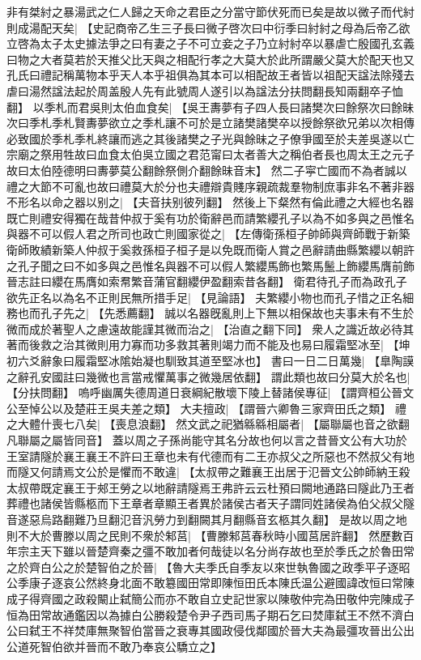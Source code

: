 非有桀紂之暴湯武之仁人歸之天命之君臣之分當守節伏死而已矣是故以微子而代紂則成湯配天矣|{
	【史記商帝乙生三子長曰微子啓次曰中衍季曰紂紂之母為后帝乙欲立啓為太子太史據法爭之曰有妻之子不可立妾之子乃立紂紂卒以暴虐亡殷國孔玄義曰物之大者莫若於天推父比天與之相配行孝之大莫大於此所謂嚴父莫大於配天也又孔氏曰禮記稱萬物本乎天人本乎祖俱為其本可以相配故王者皆以祖配天諡法除殘去虐曰湯然諡法起於周盖殷人先有此號周人遂引以為諡法分扶問翻長知兩翻卒子恤翻】}
以季札而君吳則太伯血食矣|{
	【吳王夀夢有子四人長曰諸樊次曰餘祭次曰餘昧次曰季札季札賢夀夢欲立之季札讓不可於是立諸樊諸樊卒以授餘祭欲兄弟以次相傳必致國於季札季札終讓而逃之其後諸樊之子光與餘昧之子僚爭國至於夫差吳遂以亡宗廟之祭用牲故曰血食太伯吳立國之君范甯曰太者善大之稱伯者長也周太王之元子故曰太伯陸德明曰夀夢莫公翻餘祭側介翻餘昧音末】}
然二子寜亡國而不為者誠以禮之大節不可亂也故曰禮莫大於分也夫禮辯貴賤序親疏裁羣物制庶事非名不著非器不形名以命之器以别之|{
	【夫音扶别彼列翻】}
然後上下粲然有倫此禮之大經也名器既亡則禮安得獨在哉昔仲叔于奚有功於衛辭邑而請繁纓孔子以為不如多與之邑惟名與器不可以假人君之所司也政亡則國家從之|{
	【左傳衛孫桓子帥師與齊師戰于新築衛師敗績新築人仲叔于奚救孫桓子桓子是以免既而衛人賞之邑辭請曲縣繁纓以朝許之孔子聞之曰不如多與之邑惟名與器不可以假人繁纓馬飾也繁馬鬛上飾纓馬膺前飾晉志註曰纓在馬膺如索帬繁音蒲官翻纓伊盈翻索昔各翻】}
衛君待孔子而為政孔子欲先正名以為名不正則民無所措手足|{
	【見論語】}
夫繁纓小物也而孔子惜之正名細務也而孔子先之|{
	【先悉薦翻】}
誠以名器旣亂則上下無以相保故也夫事未有不生於微而成於著聖人之慮遠故能謹其微而治之|{
	【治直之翻下同】}
衆人之識近故必待其著而後救之治其微則用力寡而功多救其著則竭力而不能及也易曰履霜堅冰至|{
	【坤初六爻辭象曰履霜堅冰隂始凝也馴致其道至堅冰也】}
書曰一日二日萬幾|{
	【臯陶謨之辭孔安國註曰幾微也言當戒懼萬事之微幾居依翻】}
謂此類也故曰分莫大於名也|{
	【分扶問翻】}
嗚呼幽厲失德周道日衰綱紀散壞下陵上替諸侯專征|{
	【謂齊桓公晉文公至悼公以及楚莊王吳夫差之類】}
大夫擅政|{
	【謂晉六卿魯三家齊田氏之類】}
禮之大體什喪七八矣|{
	【喪息浪翻】}
然文武之祀猶緜緜相屬者|{
	【屬聯屬也音之欲翻凡聯屬之屬皆同音】}
蓋以周之子孫尚能守其名分故也何以言之昔晉文公有大功於王室請隧於襄王襄王不許曰王章也未有代德而有二王亦叔父之所惡也不然叔父有地而隧又何請焉文公於是懼而不敢違|{
	【太叔帶之難襄王出居于氾晉文公帥師納王殺太叔帶既定襄王于郟王勞之以地辭請隧焉王弗許云云杜預曰闕地通路曰隧此乃王者葬禮也諸侯皆縣柩而下王章者章顯王者異於諸侯古者天子謂同姓諸侯為伯父叔父隧音遂惡烏路翻難乃旦翻氾音汎勞力到翻闕其月翻縣音玄柩其久翻】}
是故以周之地則不大於曹滕以周之民則不衆於邾莒|{
	【曹滕邾莒春秋時小國莒居許翻】}
然歷數百年宗主天下雖以晉楚齊秦之彊不敢加者何哉徒以名分尚存故也至於季氏之於魯田常之於齊白公之於楚智伯之於晉|{
	【魯大夫季氏自季友以來世執魯國之政季平子逐昭公季康子逐哀公然終身北面不敢簒國田常即陳恒田氏本陳氏温公避國諱改恒曰常陳成子得齊國之政殺闞止弑簡公而亦不敢自立史記世家以陳敬仲完為田敬仲完陳成子恒為田常故通鑑因以為據白公勝殺楚令尹子西司馬子期石乞曰焚庫弑王不然不濟白公曰弑王不祥焚庫無聚智伯當晉之衰專其國政侵伐鄰國於晉大夫為最彊攻晉出公出公道死智伯欲并晉而不敢乃奉哀公驕立之】}
